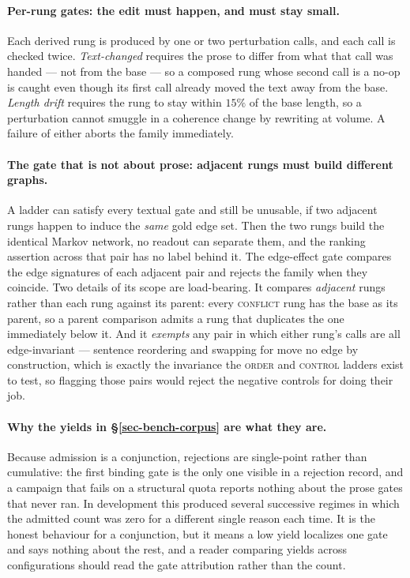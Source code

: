 \paragraph{Per-rung gates: the edit must happen, and must stay small.} Each derived rung is produced by
one or two perturbation calls, and each call is checked twice. \emph{Text-changed} requires the prose to
differ from what that call was handed --- not from the base --- so a composed rung whose second call is a
no-op is caught even though its first call already moved the text away from the base. \emph{Length drift}
requires the rung to stay within $15\%$ of the base length, so a perturbation cannot smuggle in a coherence
change by rewriting at volume. A failure of either aborts the family immediately.

\paragraph{The gate that is not about prose: adjacent rungs must build different graphs.} A ladder can
satisfy every textual gate and still be unusable, if two adjacent rungs happen to induce the \emph{same}
gold edge set. Then the two rungs build the identical Markov network, no readout can separate them, and the
ranking assertion across that pair has no label behind it. The edge-effect gate compares the edge
signatures of each adjacent pair and rejects the family when they coincide. Two details of its scope are
load-bearing. It compares \emph{adjacent} rungs rather than each rung against its parent: every
\textsc{conflict} rung has the base as its parent, so a parent comparison admits a rung that duplicates the
one immediately below it. And it \emph{exempts} any pair in which either rung's calls are all
edge-invariant --- sentence reordering and swapping  for  move no edge
by construction, which is exactly the invariance the \textsc{order} and \textsc{control} ladders exist to
test, so flagging those pairs would reject the negative controls for doing their job.

\paragraph{Why the yields in \S\ref{sec-bench-corpus} are what they are.} Because admission is a
conjunction, rejections are single-point rather than cumulative: the first binding gate is the only one
visible in a rejection record, and a campaign that fails on a structural quota reports nothing about the
prose gates that never ran. In development this produced several successive regimes in which the admitted
count was zero for a different single reason each time. It is the honest behaviour for a conjunction, but it
means a low yield localizes one gate and says nothing about the rest, and a reader comparing yields across
configurations should read the gate attribution rather than the count.

